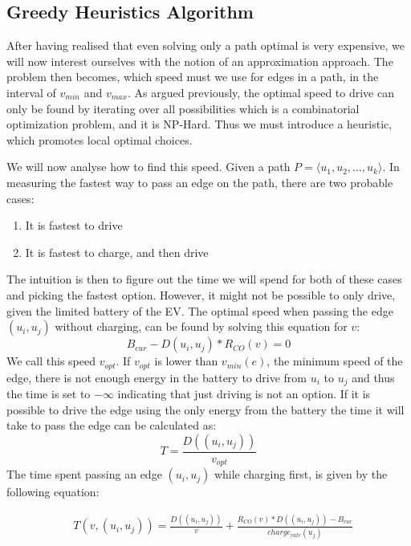 \subsection{Greedy Heuristics Algorithm}\label{sec:greedy}
After having realised that even solving only a path optimal is very expensive, we will now interest ourselves with the notion of an approximation approach. The problem then becomes, which speed must we use for edges in a path, in the interval of $v_{min}$ and $v_{max}$. As argued previously, the optimal speed to drive can only be found by iterating over all possibilities which is a combinatorial optimization problem, and it is NP-Hard. Thus we must introduce a heuristic, which promotes local optimal choices. 

We will now analyse how to find this speed. Given a path $P = \langle u_1,u_2,\dots,u_k \rangle$. In measuring the fastest way to pass an edge on the path, there are two probable cases:
\begin{enumerate}
	\item It is fastest to drive
	\item It is fastest to charge, and then drive
\end{enumerate}

The intuition is then to figure out the time we will spend for both of these cases and picking the fastest option. However, it might not be possible to only drive, given the limited battery of the EV. The optimal speed when passing the edge $(u_i, u_j)$ without charging, can be found by solving this equation for $v$:
\[B_{cur} - D(u_i, u_j) * R_{CO}(v) = 0\] 
We call this speed $v_{opt}$. If $v_{opt}$ is lower than $v_{min}(e)$, the minimum speed of the edge, there is not enough energy in the battery to drive from $u_i$ to $u_j$ and thus the time is set to $-\infty$ indicating that just driving is not an option. If it is possible to drive the edge using the only energy from the battery the time it will take to pass the edge can be calculated as:
 \[T = \frac{D((u_i, u_j))}{v_{opt}} \] 
The time spent passing an edge $(u_i, u_j)$ while charging first, is given by the following equation:

\begin{equation*}
\begin{aligned}
 & T(v,(u_i, u_j)) = \frac{D((u_i, u_j))}{v} + \frac{R_{CO}(v) * D((u_i, u_j)) - B_{cur}}{charge_{rate}(u_j)}
\end{aligned}
\end{equation*}\label{eq:drivingAndCharging}

